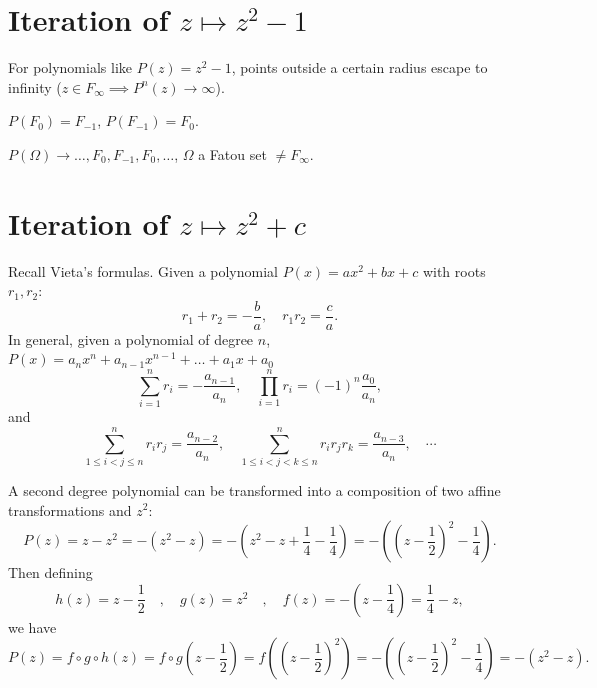 \section{Iteration of $z \mapsto z^2 - 1$}
\label{sec:iteration_of_z_squared_minus_one}

For polynomials like $P(z) = z^2 - 1$, points outside a certain radius escape to
infinity ($z \in F_\infty \implies P^n(z) \to \infty$).

$P(F_0) = F_{-1}$, $P(F_{-1}) = F_0$.

$P(\Omega) \to \ldots, F_0, F_{-1}, F_0, \ldots$, $\Omega$ a Fatou set $\neq
F_\infty$.

\section{Iteration of $z \mapsto z^2 + c$}
\label{sec:iteration_of_z_squared_plus_c}

Recall Vieta's formulas. Given a polynomial $P(x) = ax^2 + bx + c$ with roots
$r_1, r_2$:
\begin{equation*}
    r_1 + r_2 = -\frac{b}{a}, \quad r_1 r_2 = \frac{c}{a}.
\end{equation*}
In general, given a polynomial of degree $n$, $P(x) = a_n x^n + a_{n-1} x^{n-1}
+ \dots + a_1 x + a_0$
\begin{equation*}
    \sum_{i=1}^{n} r_i = -\frac{a_{n-1}}{a_n}, \quad \prod_{i=1}^{n} r_i = (-1)^n \frac{a_0}{a_n},
\end{equation*}
and
\begin{equation*}
    \sum_{1 \le i < j \le n}^{n} r_i r_j = \frac{a_{n-2}}{a_n}, \quad \sum_{1 \le i < j < k \le n}^{n} r_i r_j r_k = \frac{a_{n-3}}{a_n}, \quad \cdots
\end{equation*}

A second degree polynomial can be transformed into a composition of two affine
transformations and $z^2$:
\begin{equation*}
    P(z) = z - z^2 = -(z^2 - z) = -\left(z^2 - z + \frac{1}{4} - \frac{1}{4}\right) = -\left(\left(z - \frac{1}{2}\right)^2 - \frac{1}{4}\right).
\end{equation*}
Then defining
\begin{equation*}
    h(z) = z - \frac{1}{2} \quad , \quad g(z) = z^2 \quad , \quad f(z) = -\left(z - \frac{1}{4}\right) = \frac{1}{4} - z,
\end{equation*}
we have
\begin{equation*}
    P(z) = f \circ g \circ h(z) = f \circ g \left(z - \frac{1}{2}\right) = f \left(\left(z - \frac{1}{2}\right)^2\right) = -\left(\left(z - \frac{1}{2}\right)^2 - \frac{1}{4}\right) = -(z^2 - z).
\end{equation*}

